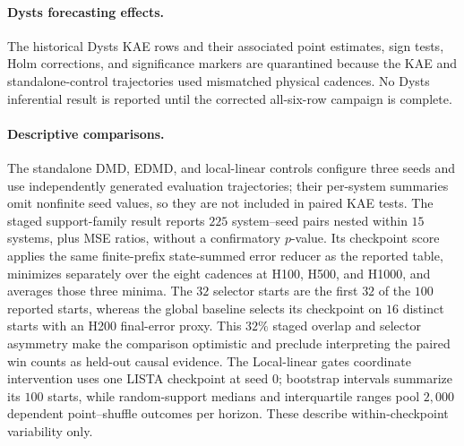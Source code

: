 \paragraph{Dysts forecasting effects.}
The historical Dysts KAE rows and their associated point estimates, sign tests, Holm corrections, and significance markers are quarantined because the KAE and standalone-control trajectories used mismatched physical cadences. No Dysts inferential result is reported until the corrected all-six-row campaign is complete.

\paragraph{Descriptive comparisons.}
The standalone DMD, EDMD, and local-linear controls configure three seeds and use independently generated evaluation trajectories; their per-system summaries omit nonfinite seed values, so they are not included in paired KAE tests. The staged support-family result reports \(225\) system--seed pairs nested within \(15\) systems, plus MSE ratios, without a confirmatory \(p\)-value. Its checkpoint score applies the same finite-prefix state-summed error reducer as the reported table, minimizes separately over the eight cadences at H100, H500, and H1000, and averages those three minima. The \(32\) selector starts are the first \(32\) of the \(100\) reported starts, whereas the global baseline selects its checkpoint on \(16\) distinct starts with an H200 final-error proxy. This \(32\%\) staged overlap and selector asymmetry make the comparison optimistic and preclude interpreting the paired win counts as held-out causal evidence. The Local-linear gates coordinate intervention uses one LISTA checkpoint at seed \(0\); bootstrap intervals summarize its \(100\) starts, while random-support medians and interquartile ranges pool \(2{,}000\) dependent point--shuffle outcomes per horizon. These describe within-checkpoint variability only.

